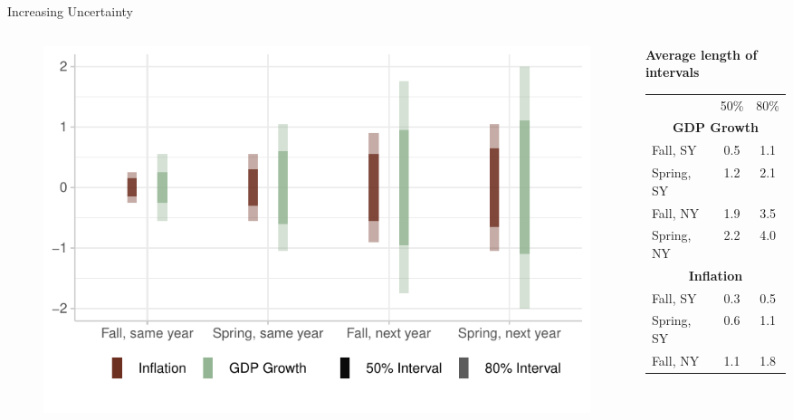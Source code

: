 \documentclass[en]{sdqbeamer}
\begin{document}
\begin{frame}{Increasing Uncertainty}

\begin{columns}
\begin{column}{0.6\textwidth}
    \begin{figure}
        \centering
        \includegraphics[width=\textwidth]{figures/horizon_uncc.pdf}
        \label{fig:enter-label}
    \end{figure}
\end{column}
\begin{column}{0.4\textwidth}
\centering
\textbf{Average length of intervals}
\begin{table}
\begin{tabular}{ l c c }
&   50\%  & 80\%\\[0.3em]
\multicolumn{3}{c}{\textbf{GDP Growth}}\\
Fall,  SY & 0.5 & 1.1\\ 
Spring, SY &1.2 &2.1 \\ 
Fall, NY & 1.9 & 3.5\\ 
Spring, NY &2.2 &4.0 \\[0.3em] 
\multicolumn{3}{c}{\textbf{Inflation}}\\
Fall,  SY & 0.3 & 0.5\\ 
Spring, SY &0.6 &1.1 \\ 
Fall, NY & 1.1 & 1.8\\ 

\end{tabular}
\end{table}
\end{column}
\end{columns}
\end{frame}
\end{document}
